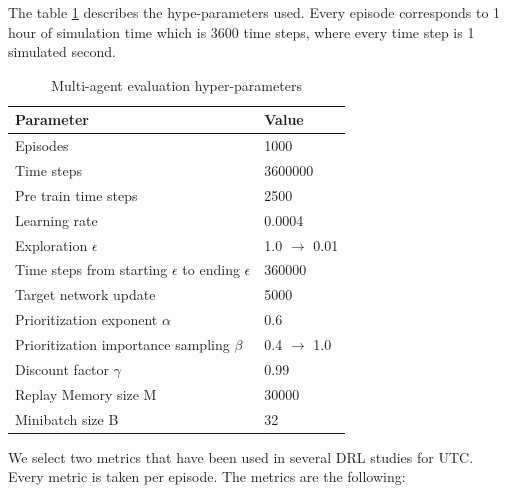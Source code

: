 \documentclass{llncs}
\begin{document}
The table \ref{tab:MARLhyp} describes the hype-parameters used. Every episode corresponds to 1 hour of simulation time which is 3600 time steps, where every time step is 1 simulated second.

\begin{table}
\centering
\caption{Multi-agent evaluation hyper-parameters}
 \begin{tabularx}{\columnwidth}{X|X}
 \hline
 Parameter & Value \\ [0.5ex] 
 \hline
 \hline
 Episodes & 1000 \\
 Time steps & 3600000 \\
 Pre train time steps & 2500 \\
 Learning rate & 0.0004 \\
 Exploration $\epsilon$ & 1.0 $\rightarrow$ 0.01 \\
 Time steps from starting $\epsilon$ to ending $\epsilon$ & 360000 \\
 Target network update & 5000 \\
 Prioritization exponent $\alpha$ & 0.6 \\
 Prioritization importance sampling $\beta$ & 0.4 $\rightarrow$ 1.0 \\
 Discount factor $\gamma$ & 0.99 \\
 Replay Memory size M & 30000 \\
 Minibatch size B & 32 \\
 \hline
\end{tabularx}
\label{tab:MARLhyp}
\end{table}

We select two metrics that have been used in several DRL studies for UTC. Every metric is taken per episode. The metrics are the following:
\end{document}
